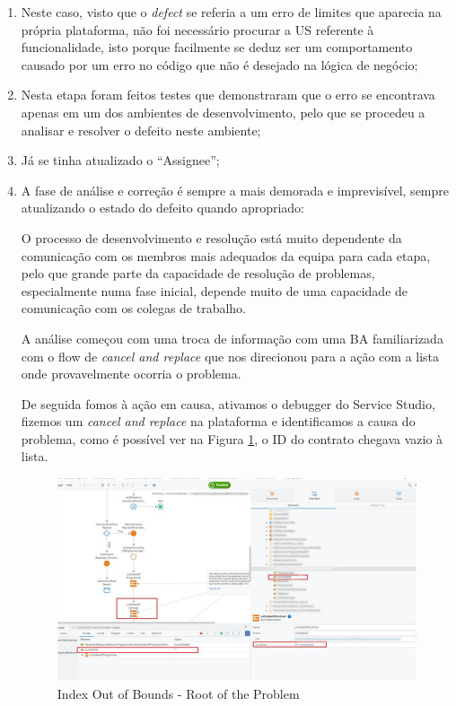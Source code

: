                 \begin{enumerate}
                    \item Neste caso, visto que o \textit{defect} se referia a um erro de limites que aparecia na própria plataforma, não foi necessário procurar a US referente à funcionalidade, isto porque facilmente se deduz ser um comportamento causado por um erro no código que não é desejado na lógica de negócio;

                    \item Nesta etapa foram feitos testes que demonstraram que o erro se encontrava apenas em um dos ambientes de desenvolvimento, pelo que se procedeu a analisar e resolver o defeito neste ambiente;

                    \item Já se tinha atualizado o ``Assignee'';

                    \item A fase de análise e correção é sempre a mais demorada e imprevisível, sempre atualizando o estado do defeito quando apropriado:
                    
                    O processo de desenvolvimento e resolução está muito dependente da comunicação com os membros mais adequados da equipa para cada etapa, pelo que grande parte da capacidade de resolução de problemas, especialmente numa fase inicial, depende muito de uma capacidade de comunicação com os colegas de trabalho. 

                    A análise começou com uma troca de informação com uma BA familiarizada com o flow de \textit{cancel and replace} que nos direcionou para a ação com a lista onde provavelmente ocorria o problema.

                    De seguida fomos à ação em causa, ativamos o debugger do Service Studio, fizemos um \textit{cancel and replace} na plataforma e identificamos a causa do problema, como é possível ver na Figura \ref{fig:index_out_of_bounds1}, o ID do contrato chegava vazio à lista. 

                    \begin{figure}[H]
                        \centering
                        \includegraphics[width=\textwidth]{imgs/IndexOutOfBounds1.jpg}
                        \caption{Index Out of Bounds - Root of the Problem}\label{fig:index_out_of_bounds1}
                    \end{figure}


\end{enumerate}
